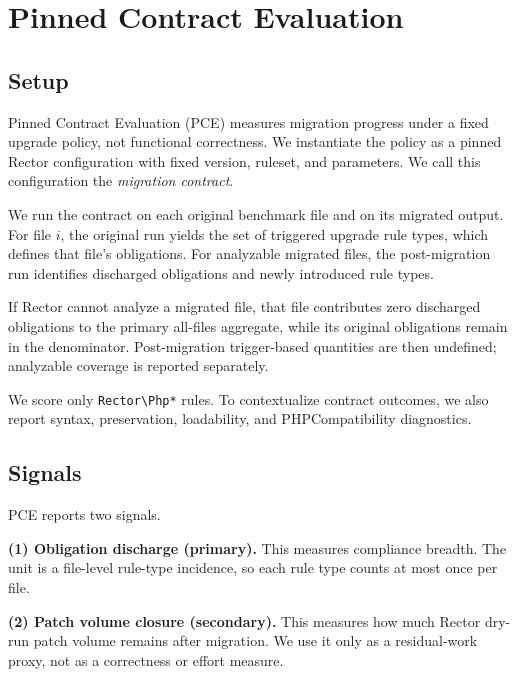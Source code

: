 \section{Pinned Contract Evaluation}
\label{sec:rector_eval}

\subsection{Setup}
\label{sec:pce_objective_instrument}

Pinned Contract Evaluation (PCE) measures migration progress under a fixed upgrade policy, not functional correctness. We instantiate the policy as a pinned Rector configuration with fixed version, ruleset, and parameters.\cite{rector} We call this configuration the \emph{migration contract}.

We run the contract on each original benchmark file and on its migrated output. For file $i$, the original run yields the set of triggered upgrade rule types, which defines that file's obligations. For analyzable migrated files, the post-migration run identifies discharged obligations and newly introduced rule types.

If Rector cannot analyze a migrated file, that file contributes zero discharged obligations to the primary all-files aggregate, while its original obligations remain in the denominator. Post-migration trigger-based quantities are then undefined; analyzable coverage is reported separately.

We score only \texttt{Rector\textbackslash Php*} rules. To contextualize contract outcomes, we also report syntax, preservation, loadability, and PHPCompatibility diagnostics.\cite{phpcompat}

\subsection{Signals}
\label{sec:pce_primary_scores}

PCE reports two signals.

\textbf{(1) Obligation discharge (primary).}
This measures compliance breadth. The unit is a file-level rule-type incidence, so each rule type counts at most once per file.

\textbf{(2) Patch volume closure (secondary).}
This measures how much Rector dry-run patch volume remains after migration. We use it only as a residual-work proxy, not as a correctness or effort measure.

